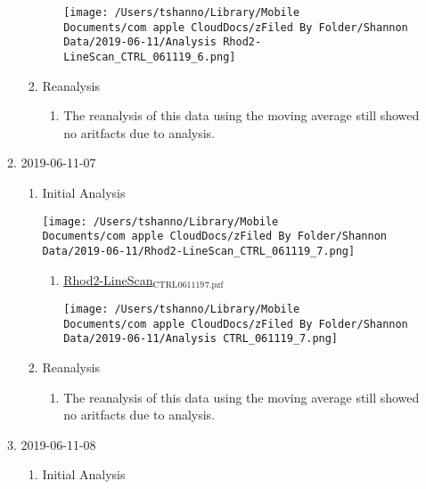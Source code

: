 \documentclass[11pt]{article}
\begin{document}
\begin{enumerate}
\begin{enumerate}
\begin{enumerate}
\begin{enumerate}
\label{sec:org6fe6f28}
\begin{center}
\texttt{[image: /Users/tshanno/Library/Mobile Documents/com~apple~CloudDocs/zFiled By Folder/Shannon Data/2019-06-11/Analysis Rhod2-LineScan\_CTRL\_061119\_6.png]}
\end{center}
\end{enumerate}
\item Reanalysis
\label{sec:org8bf45ea}
\begin{enumerate}
\item The reanalysis of this data using the moving average still showed no aritfacts due to analysis.
\label{sec:org3f1ff53}
\end{enumerate}
\end{enumerate}
\item 2019-06-11-07
\label{sec:org94acda0}
\begin{enumerate}
\item Initial Analysis
\label{sec:org97c848b}
\begin{center}
\texttt{[image: /Users/tshanno/Library/Mobile Documents/com~apple~CloudDocs/zFiled By Folder/Shannon Data/2019-06-11/Rhod2-LineScan\_CTRL\_061119\_7.png]}
\end{center}
\begin{enumerate}
\item \href{file:///Users/tshanno/Library/Mobile Documents/com\~apple\~CloudDocs/zFiled By Folder/Shannon Data/2019-06-11/Rhod2-LineScan\_CTRL\_061119\_7.pzf}{Rhod2-LineScan\(_{\text{CTRL}}\)\(_{\text{061119}}\)\(_{\text{7.pzf}}\)}
\label{sec:orgff4950a}
\begin{center}
\texttt{[image: /Users/tshanno/Library/Mobile Documents/com~apple~CloudDocs/zFiled By Folder/Shannon Data/2019-06-11/Analysis CTRL\_061119\_7.png]}
\end{center}
\end{enumerate}
\item Reanalysis
\label{sec:org76c218b}
\begin{enumerate}
\item The reanalysis of this data using the moving average still showed no aritfacts due to analysis.
\label{sec:orgb513d6f}
\end{enumerate}
\end{enumerate}
\item 2019-06-11-08
\label{sec:org0d148c4}
\begin{enumerate}
\item Initial Analysis
\label{sec:orge2ab84b}

\end{enumerate}
\end{enumerate}
\end{enumerate}
\end{document}
